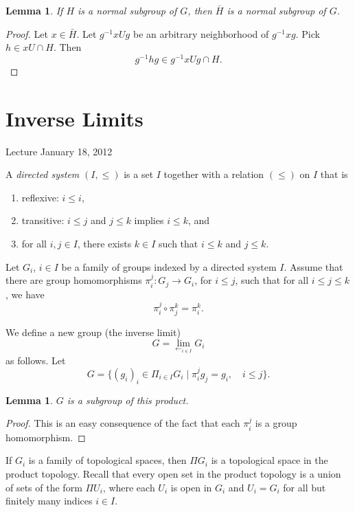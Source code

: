 \documentclass{amsart}
\newtheorem{lemma}[equation]{Lemma}
\begin{document}
\begin{lemma}  If $H$ is a normal subgroup of $G$, then $\bar H$ is a normal
subgroup of $G$.
\end{lemma}

\begin{proof}  Let $x\in \bar H$.  Let $g^{-1} x U g$ be an arbitrary neighborhood
of $g^{-1} x g$.  Pick $h\in x U\cap H$.  Then
\[
g^{-1} h g \in g^{-1}x U g \cap H.
\]
\end{proof}

\newpage
\section{Inverse Limits}

Lecture January 18, 2012

A {\it directed system} $(I,\le)$ is a set $I$ together with a relation $(\le)$ on $I$
 that is
\begin{enumerate}
\item reflexive: $i\le i$,
\item transitive: $i\le j$ and $j\le k$ implies $i\le k$, and
\item for all $i, j\in I$, there exists $k\in I$ such that $i\le k$ and $j\le k$.
\end{enumerate}

Let $G_i$, $i\in I$ be a family of groups indexed by a directed system $I$.
Assume that there are group homomorphisms $\pi^j_i:G_j\to G_i$, for $i\le j$,
such that
for all $i\le j\le k$, we have 
\begin{equation}\label{eqn:pi-trans}
\pi^j_i\circ \pi^k_j = \pi^k_i.
\end{equation}

We define a new group (the inverse limit)
\[
G = \lim_{\leftarrow_{i\in I}} G_i
\]
as follows.
Let 
\[
G = \{(g_i)_i \in \Pi_{i\in I} G_i\mid \pi^j_i g_j = g_i, \quad i\le j\}.
\]

\begin{lemma}
$G$ is a subgroup of this product.
\end{lemma}

\begin{proof}
This is an easy consequence of the fact that each $\pi^j_i$ is a group
homomorphism.
\end{proof}

If $G_i$ is a family of topological spaces, then
$\Pi G_i$ is a topological space in the product topology.  Recall that
every open set in the product topology is a union of sets of the form
$\Pi U_i$, where each $U_i$ is open in $G_i$ and $U_i = G_i$ for all
but finitely many indices $i\in I$.
\end{document}
